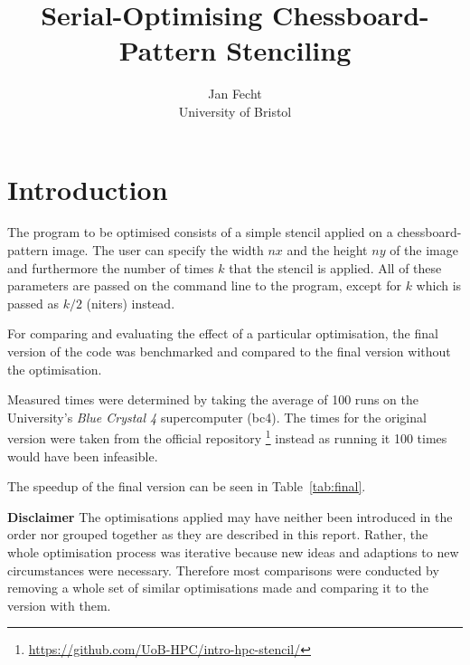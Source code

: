 \documentclass[letterpaper,twocolumn,10pt]{article}
\begin{document}

\date{} %

\title{Serial-Optimising Chessboard-Pattern Stenciling}

\author{
  {\rm Jan Fecht}\\
  University of Bristol}

\maketitle


\section*{Introduction}
The program to be optimised consists of a simple stencil applied on a chessboard-pattern image.
The user can specify the width $nx$ and the height $ny$ of the image and furthermore
the number of times $k$ that the stencil is applied. All of these parameters are passed on the command line to the program, except for $k$ which is passed as $k/2$ (niters) instead.

For comparing and evaluating the effect of
a particular optimisation, the final version of the code was benchmarked
and compared to the final version without the optimisation.

Measured times were determined by taking the average of 100 runs
on the University's \textit{Blue Crystal 4} supercomputer (bc4). The times for
the original version were taken from the official repository
\footnote{\url{https://github.com/UoB-HPC/intro-hpc-stencil/}} instead as running it 100 times would have been infeasible.

The speedup of the final version can be seen in Table~\ref{tab:final}.

\vspace{0.15in}

\textbf{Disclaimer} The optimisations applied may have neither been introduced
in the order nor grouped together as they are described in this report. Rather, the 
whole optimisation process was iterative because new ideas and adaptions to new
circumstances were necessary. Therefore most comparisons were conducted by removing
a whole set of similar optimisations made and comparing it to the version with them.
\end{document}
